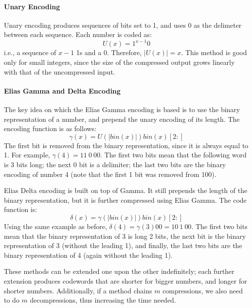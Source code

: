 \paragraph{Unary Encoding}
Unary encoding produces sequences of bits set to 1, and uses 0 as the delimeter between each sequence. Each number is coded as:
\begin{equation*}
    U(x) = 1^{x-1}0
\end{equation*}
i.e., a sequence of $x-1$ 1s and a 0. Therefore, $|U(x)| = x$. This method is good only for small integers, since the size of the compressed output grows linearly with that of the uncompressed input.

\paragraph{Elias Gamma and Delta Encoding}
The key idea on which the Elias Gamma encoding is based is to use the binary representation of a number, and prepend the unary encoding of its length. The encoding function is as follows:
\begin{equation*}
    \gamma(x) = U(|\textit{bin}(x)|) \textit{bin}(x)[2:]
\end{equation*}
The first bit is removed from the binary representation, since it is always equal to 1. For example, $\gamma(4) = 11 \ 0 \ 00$. The first two bits mean that the following word is 3 bits long; the next 0 bit is a delimiter; the last two bits are the binary encoding of number 4 (note that the first 1 bit was removed from 100).

Elias Delta encoding is built on top of Gamma. It still prepends the length of the binary representation, but it is further compressed using Elias Gamma. The code function is:
\begin{equation*}
    \delta(x) = \gamma(|\textit{bin}(x)|) \textit{bin}(x)[2:]
\end{equation*}
Using the same example as before, $\delta(4) = \gamma(3) 00 = 10 \ 1 \ 00$. The first two bits mean that the binary representation of 3 is long 2 bits, the next bit is the binary representation of 3 (without the leading 1), and finally, the last two bits are the binary representation of 4 (again without the leading 1).

These methods can be extended one upon the other indefinitely; each further extension produces codewords that are shorter for bigger numbers, and longer for shorter numbers. Additionally, if a method chains $m$ compressions, we also need to do $m$ decompressions, thus increasing the time needed.

